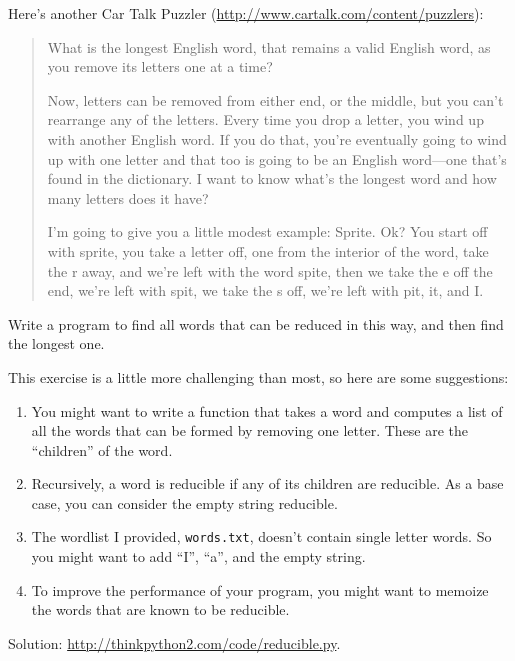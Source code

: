 \documentclass[10pt]{book}
\begin{document}
\begin{exercise}

Here's another Car Talk Puzzler
(\url{http://www.cartalk.com/content/puzzlers}):

\begin{quote}
What is the longest English word, that remains a valid English word,
as you remove its letters one at a time?

Now, letters can be removed from either end, or the middle, but you
can't rearrange any of the letters. Every time you drop a letter, you
wind up with another English word. If you do that, you're eventually
going to wind up with one letter and that too is going to be an
English word---one that's found in the dictionary. I want to know
what's the longest word and how many letters does it
have?

I'm going to give you a little modest example: Sprite. Ok? You start
off with sprite, you take a letter off, one from the interior of the
word, take the r away, and we're left with the word spite, then we
take the e off the end, we're left with spit, we take the s off, we're
left with pit, it, and I.
\end{quote}

Write a program to find all words that can be reduced in this way,
and then find the longest one.

This exercise is a little more challenging than most, so here are
some suggestions:

\begin{enumerate}

\item You might want to write a function that takes a word and
  computes a list of all the words that can be formed by removing one
  letter.  These are the ``children'' of the word.

\item Recursively, a word is reducible if any of its children
are reducible.  As a base case, you can consider the empty
string reducible.

\item The wordlist I provided, {\tt words.txt}, doesn't
contain single letter words.  So you might want to add
``I'', ``a'', and the empty string.

\item To improve the performance of your program, you might want
to memoize the words that are known to be reducible.

\end{enumerate}

Solution: \url{http://thinkpython2.com/code/reducible.py}.

\end{exercise}
\end{document}
